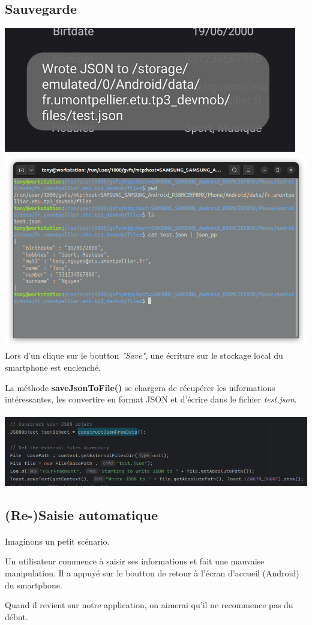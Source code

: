 \documentclass[a4paper]{article}
\begin{document}
\begin{multicols}{2}
            \subsection{Sauvegarde}
                \noindent\includegraphics[width=.47\textwidth]{persistance/savedSmall}
                \noindent\includegraphics[width=.47\textwidth]{persistance/jsonFile}
                Lors d'un clique sur le boutton \emph{"Save"}, une écriture sur le stockage local du smartphone est enclenché.

                La méthode \textbf{saveJsonToFile()} se chargera de récupérer les informations intéressantes, les convertire en format JSON et d'écrire dans le fichier \emph{test.json}.
                \\\\\noindent\includegraphics[width=.47\textwidth]{persistance/write}
            \subsection{(Re-)Saisie automatique}
                \paragraph{}
                    Imaginons un petit scénario. 

                    Un utilisateur commence à saisir ses informations et fait une mauvaise manipulation. Il a appuyé sur le boutton de retour à l'écran d'accueil (Android) du smartphone. 

                    Quand il revient sur notre application, on aimerai qu'il ne recommence pas du début.

\end{multicols}
\end{document}
